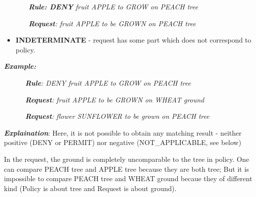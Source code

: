\documentclass{article}
\newcommand\liststyleWWviiiNumxxi{%
\renewcommand\labelitemi{[F0B7?]}
\renewcommand\labelitemii{o}
\renewcommand\labelitemiii{[F0A7?]}
\renewcommand\labelitemiv{[F0B7?]}
}
\begin{document}
{\upshape\color{black}
\foreignlanguage{english}{\textbf{\textit{\ \ \ \ \ \ Rule: DENY
}}}\foreignlanguage{english}{\textit{fruit APPLE to GROW on PEACH
tree}}}

{\upshape\color{black}
\foreignlanguage{english}{\textbf{\textit{\ \ \ \ \ \ Request}}}\foreignlanguage{english}{\textit{:
fruit APPLE to be GROWN on PEACH tree}}}

\liststyleWWviiiNumxxi
\begin{itemize}
\item {\color{black}
\foreignlanguage{english}{\textbf{INDETERMINATE}}\foreignlanguage{english}{
- request has some part which does not correspond to policy.}}
\end{itemize}
{\bfseries\itshape\color{black}
Example: }

{\upshape\color{black}
\foreignlanguage{english}{\textit{\ \ \ \ \ \ }}\foreignlanguage{english}{\textbf{\textit{Rule}}}\foreignlanguage{english}{\textit{:
DENY fruit APPLE to GROW on PEACH tree}}}

{\upshape\color{black}
\foreignlanguage{english}{\textit{\ \ \ \ \ \ }}\foreignlanguage{english}{\textbf{\textit{Request}}}\foreignlanguage{english}{\textit{:
fruit APPLE to be GROWN on WHEAT ground}}}

{\upshape\color{black}
\foreignlanguage{english}{\textit{\ \ \ \ \ \ }}\foreignlanguage{english}{\textbf{\textit{Request}}}\foreignlanguage{english}{\textit{:
flower SUNFLOWER to be grown on PEACH tree}}}

{\upshape\color{black}
\foreignlanguage{english}{\textbf{\textit{Explaination}}}\foreignlanguage{english}{:
Here, it is not possible to obtain any matching result - neither
positive (DENY or PERMIT) nor negative (NOT\_APPLICABLE, see below)}}

{\color{black}
In the request, the {\textquotedbl}ground{\textquotedbl} is completely
uncomparable to the {\textquotedbl}tree{\textquotedbl} in policy. One
can compare {\textquotedbl}PEACH tree{\textquotedbl} and
{\textquotedbl}APPLE tree{\textquotedbl} because they are both
{\textquotedbl}tree{\textquotedbl}; But it is impossible to compare
{\textquotedbl}PEACH tree{\textquotedbl} and {\textquotedbl}WHEAT
ground{\textquotedbl} becaue they of different kind (Policy is about
tree and Request is about ground).}
\end{document}
